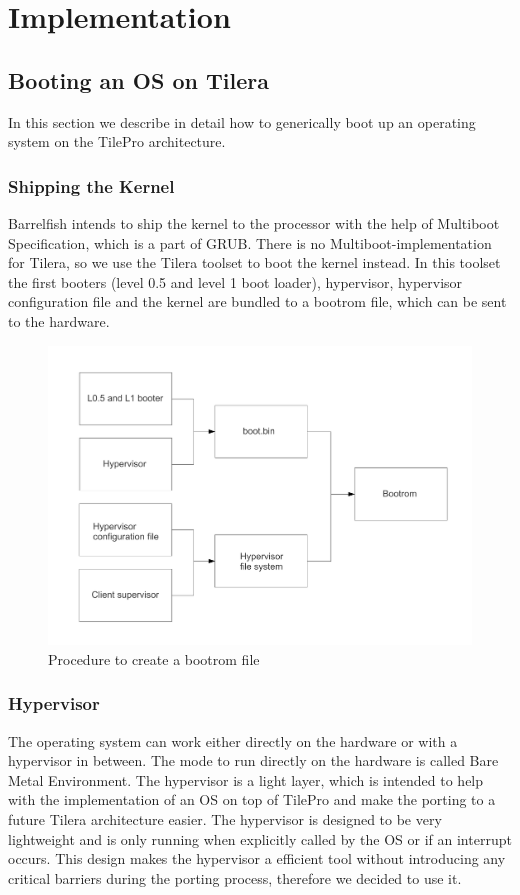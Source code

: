 \documentclass[a4paper,twoside]{report} %
\begin{document}
\chapter{Implementation}

\section{Booting an OS on Tilera}
In this section we describe in detail how to generically boot up an operating system on the TilePro architecture.

\subsection{Shipping the Kernel}
Barrelfish intends to ship the kernel to the processor with the help of Multiboot Specification, which is a part of GRUB. There is no Multiboot-implementation for Tilera, so we use the Tilera toolset to boot the kernel instead. In this toolset the first booters (level 0.5 and level 1 boot loader), hypervisor, hypervisor configuration file and the kernel are bundled to a bootrom file, which can be sent to the hardware.

\begin{figure}
  \centering
  \includegraphics[scale=0.4]{figures/make_bootrom}
  \caption{Procedure to create a bootrom file}
  \label{pic:bootrom}
\end{figure}

\subsection{Hypervisor}
\label{sec:hypervisor}
The operating system can work either directly on the hardware or with a hypervisor in between. The mode to run directly on the hardware is called Bare Metal Environment. The hypervisor is a light layer, which is intended to help with the implementation of an OS on top of TilePro and make the porting to a future Tilera architecture easier. The hypervisor is designed to be very lightweight and is only running when explicitly called by the OS or if an interrupt occurs. This design makes the hypervisor a efficient tool without introducing any critical barriers during the porting process, therefore we decided to use it.
\end{document}
